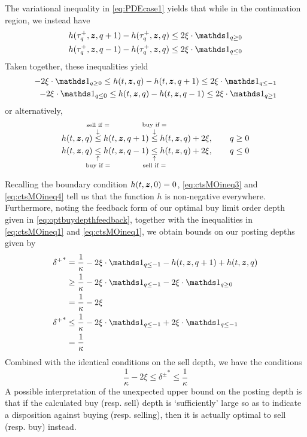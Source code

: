 The variational inequality in \eqref{eq:PDEcase1} yields that while in the continuation region, we instead have
\begin{align}
h(\tau^+_q, \bz, q+1) - h(\tau^+_q,\bz,q) & \leq 2 \xi \cdot \indicator_{q \geq 0} \\
h(\tau^+_q, \bz, q-1) - h(\tau^+_q,\bz,q) & \leq 2 \xi \cdot \indicator_{q \leq 0}
\end{align}
Taken together, these inequalities yield
\begin{align}
-2\xi \cdot \indicator_{q \geq 0} \leq h(t,\bz,q) - h(t,\bz,q+1) \leq 2\xi \cdot \indicator_{q \leq -1} \label{eq:ctsMOineq1}\\
-2\xi \cdot \indicator_{q \leq 0} \leq h(t,\bz,q) - h(t,\bz,q-1) \leq 2\xi \cdot \indicator_{q \geq 1} \label{eq:ctsMOineq2}
\end{align}
or alternatively,
\begin{align}
h(t,\bz,q) \overset{\text{\makebox[0pt]{sell if =}}}{\overset{\downarrow}{\leq}} h(t,\bz,q+1) \overset{\text{\makebox[0pt]{buy if =}}}{\overset{\downarrow}{\leq}} h(t,\bz,q) + 2\xi, \qquad q \geq 0 \label{eq:ctsMOineq3}\\
h(t,\bz,q) \underset{\text{\makebox[0pt]{buy if =}}}{\underset{\uparrow}{\leq}} h(t,\bz,q-1) \underset{\text{\makebox[0pt]{sell if =}}}{\underset{\uparrow}{\leq}} h(t,\bz,q) + 2\xi, \qquad q \leq 0 \label{eq:ctsMOineq4}
\end{align}

Recalling the boundary condition $h(t,\bm{z},0) = 0$, \eqref{eq:ctsMOineq3} and \eqref{eq:ctsMOineq4} tell us that the function $h$ is non-negative everywhere. Furthermore, noting the feedback form of our optimal buy limit order depth given in \eqref{eq:optbuydepthfeedback}, together with the inequalities in \eqref{eq:ctsMOineq1} and \eqref{eq:ctsMOineq1}, we obtain bounds on our posting depths given by
\begin{align}
{\delta^+}^* & = \frac{1}{\kappa} - 2 \xi \cdot \indicator_{q \leq -1} - h(t,\bz,q+1) + h(t,\bz,q) \\
& \geq \frac{1}{\kappa} - 2 \xi \cdot \indicator_{q \leq -1} - 2 \xi \cdot \indicator_{q \geq 0} \\
& = \frac{1}{\kappa} - 2\xi \\
{\delta^+}^* & \leq \frac{1}{\kappa} - 2 \xi \cdot \indicator_{q \leq -1} + 2 \xi \cdot \indicator_{q \leq -1} \\
& = \frac{1}{\kappa}
\end{align}
Combined with the identical conditions on the sell depth, we have the conditions
\begin{equation}\label{eq:deltaslowerboundcase1}
\boxed{ \frac{1}{\kappa} - 2\xi  \leq {\delta^\pm}^* \leq \frac{1}{\kappa} }
\end{equation}
A possible interpretation of the unexpected upper bound on the posting depth is that if the calculated buy (resp. sell) depth is `sufficiently' large so as to indicate a disposition against buying (resp. selling), then it is actually optimal to sell (resp. buy) instead.

